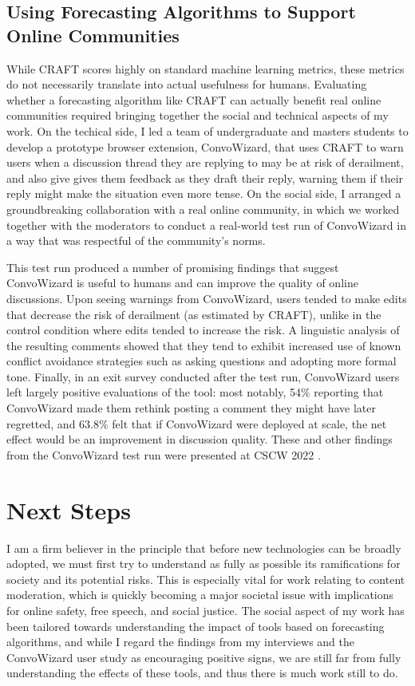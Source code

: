 \documentclass[11pt,letterpaper]{article}
\begin{document}
\subsection{Using Forecasting Algorithms to Support Online Communities}
While CRAFT scores highly on standard machine learning metrics, these metrics do not necessarily translate into actual usefulness for humans.
Evaluating whether a forecasting algorithm like CRAFT can actually benefit real online communities required bringing together the social and technical aspects of my work.
On the techical side, I led a team of undergraduate and masters students to develop a prototype browser extension, ConvoWizard, that uses CRAFT to warn users when a discussion thread they are replying to may be at risk of derailment, and also give gives them feedback as they draft their reply, warning them if their reply might make the situation even more tense.
On the social side, I arranged a groundbreaking collaboration with a real online community, in which we worked together with the moderators to conduct a real-world test run of ConvoWizard in a way that was respectful of the community's norms.

This test run produced a number of promising findings that suggest ConvoWizard is useful to humans and can improve the quality of online discussions.
Upon seeing warnings from ConvoWizard, users tended to make edits that decrease the risk of derailment (as estimated by CRAFT), unlike in the control condition where edits tended to increase the risk.
A linguistic analysis of the resulting comments showed that they tend to exhibit increased use of known conflict avoidance strategies such as asking questions and adopting more formal tone.
Finally, in an exit survey conducted after the test run, ConvoWizard users left largely positive evaluations of the tool: most notably, 54\% reporting that ConvoWizard made them rethink posting a comment they might have later regretted, and 63.8\% felt that if ConvoWizard were deployed at scale, the net effect would be an improvement in discussion quality.
These and other findings from the ConvoWizard test run were presented at CSCW 2022 \cite{chang_thread_2022}.

\section{Next Steps}
I am a firm believer in the principle that before new technologies can be broadly adopted, we must first try to understand as fully as possible its ramifications for society and its potential risks.
This is especially vital for work relating to content moderation, which is quickly becoming a major societal issue with implications for online safety, free speech, and social justice.
The social aspect of my work has been tailored towards understanding the impact of tools based on forecasting algorithms, and while I regard the findings from my interviews and the ConvoWizard user study as encouraging positive signs, we are still far from fully understanding the effects of these tools, and thus there is much work still to do.
\end{document}
